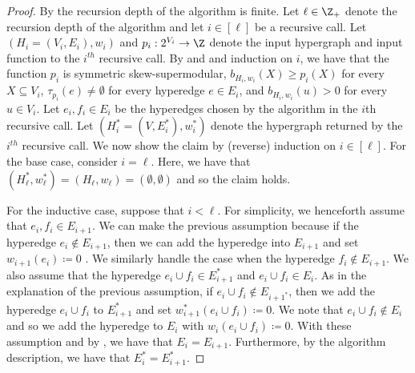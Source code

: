 \iffalse
\begin{proof}
    By  the recursion depth of the algorithm is finite. Let $\ell \in \Z_+$ denote the recursion depth of the algorithm and let $i \in [\ell]$ be a recursive call. Let $(H_i = (V_i, E_i), w_i)$ and $p_i:2^{V_i}\rightarrow\Z$ denote the input hypergraph and input function to the $i^{th}$ recursive call. By  and  and induction on $i$, we have that the function $p_i$ is symmetric skew-supermodular, $b_{H_i, w_i}(X) \geq p_i(X)$ for every $X \subseteq V_i$, $\tau_{p_i}(e)\neq \emptyset$ for every hyperedge $e\in E_i$, and $b_{H_i, w_i}(u) > 0$ for every $u \in V_i$. Let $e_i, f_i\in E_i$ be the hyperedges chosen by the algorithm in the $i$th recursive call. Let $(H_i^*=(V, E_i^*), w_i^*)$ denote the hypergraph returned by the $i^{th}$ recursive call. We now show the claim by (reverse) induction on $i \in [\ell]$. For the base case, consider $i = \ell$. Here, we have that $(H_\ell^*, w_\ell^*) = (H_\ell, w_\ell) = (\emptyset, \emptyset)$ and so the claim holds.  
    
    For the inductive case, suppose that $i < \ell$.
    For simplicity, we henceforth assume that  $e_i, f_i \in E_{i+1}$. We can make the previous assumption because if the hyperedge $e_i \not \in E_{i+1}$, then we can add the hyperedge into $E_{i+1}$ and set $w_{i+1}(e_i) \coloneqq  0$ . We similarly handle the case when the hyperedge $f_i \not \in E_{i+1}$. We also assume that the hyperedge $e_{i} \cup f_i \in E_{i+1}^*$ and $e_{i} \cup f_i \in E_{i}$. As in the explanation of the previous assumption, if $e_i\cup f_i \not \in E_{i+1^*}$, then we add the hyperedge $e_i \cup f_i$ to $E^*_{i+1}$ and set $w^*_{i+1}(e_i\cup f_i) \coloneqq  0$. We note that $e_{i}\cup f_i \not \in E_i$ and so we add the hyperedge to $E_i$ with $w_i(e_i\cup f_i) \coloneqq  0$. With these assumption and by , we have that $E_i = E_{i+1}$. Furthermore, by the algorithm description, we have that  $E_{i}^* = E_{i+1}^*$.


\end{proof}
